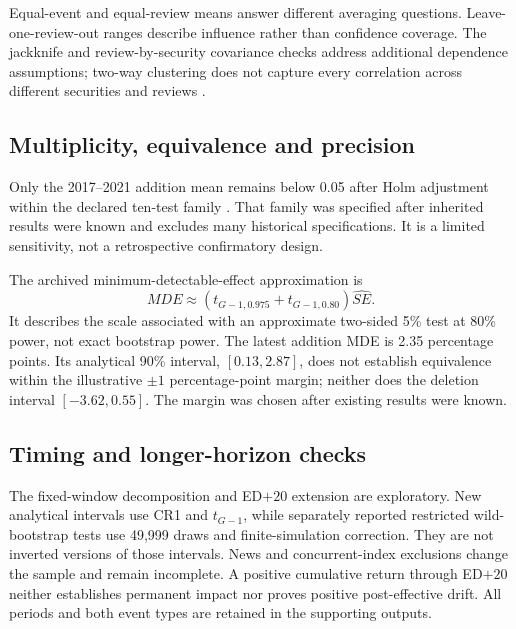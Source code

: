 Equal-event and equal-review means answer different averaging questions. Leave-one-review-out ranges describe influence rather than confidence coverage. The jackknife and review-by-security covariance checks address additional dependence assumptions; two-way clustering does not capture every correlation across different securities and reviews \citep{petersen2009,cameron2011,mackinnon2023}.



\subsection{Multiplicity, equivalence and precision}
\label{app:multi}


Only the 2017--2021 addition mean remains below 0.05 after Holm adjustment within the declared ten-test family \citep{holm1979}. That family was specified after inherited results were known and excludes many historical specifications. It is a limited sensitivity, not a retrospective confirmatory design.

The archived minimum-detectable-effect approximation is
\begin{equation}
 MDE\approx\left(t_{G-1,0.975}+t_{G-1,0.80}\right)\widehat{SE}.
 \label{eq:mde}
\end{equation}
It describes the scale associated with an approximate two-sided 5\% test at 80\% power, not exact bootstrap power. The latest addition MDE is 2.35 percentage points. Its analytical 90\% interval, $[0.13,2.87]$, does not establish equivalence within the illustrative $\pm1$ percentage-point margin; neither does the deletion interval $[-3.62,0.55]$. The margin was chosen after existing results were known.

\subsection{Timing and longer-horizon checks}
\label{app:horizon}



The fixed-window decomposition and ED$+20$ extension are exploratory. New analytical intervals use CR1 and $t_{G-1}$, while separately reported restricted wild-bootstrap tests use 49,999 draws and finite-simulation correction. They are not inverted versions of those intervals. News and concurrent-index exclusions change the sample and remain incomplete. A positive cumulative return through ED$+20$ neither establishes permanent impact nor proves positive post-effective drift. All periods and both event types are retained in the supporting outputs.
\FloatBarrier

